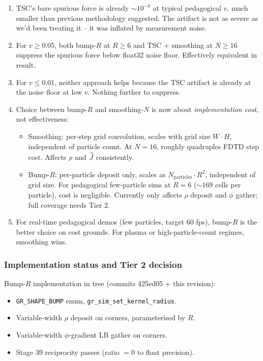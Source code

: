\documentclass[11pt,a4paper]{article}
\begin{document}
\begin{enumerate}
  \item TSC's bare spurious force is already $\sim 10^{-8}$ at
    typical pedagogical $v$, much smaller than previous methodology
    suggested.  The artifact is not as severe as we'd been treating
    it -- it was inflated by measurement noise.
  \item For $v \geq 0.05$, both bump-$R$ at $R \geq 6$ and TSC +
    smoothing at $N \geq 16$ suppress the spurious force below
    float32 noise floor.  Effectively equivalent in result.
  \item For $v \leq 0.01$, neither approach helps because the TSC
    artifact is already at the noise floor at low $v$.  Nothing
    further to suppress.
  \item Choice between bump-$R$ and smoothing-$N$ is now about
    \emph{implementation cost}, not effectiveness:
    \begin{itemize}
      \item Smoothing: per-step grid convolution, scales with grid
        size $W \cdot H$, independent of particle count.  At $N=16$,
        roughly quadruples FDTD step cost.  Affects $\rho$ and $\vec J$
        consistently.
      \item Bump-$R$: per-particle deposit only, scales as
        $N_{\mathrm{particles}} \cdot R^2$, independent of grid size.
        For pedagogical few-particle sims at $R=6$ ($\sim 169$ cells
        per particle), cost is negligible.  Currently only affects
        $\rho$ deposit and $\phi$ gather; full coverage needs Tier 2.
    \end{itemize}
  \item For real-time pedagogical demos (few particles, target 60 fps),
    bump-$R$ is the better choice on cost grounds.  For plasma or
    high-particle-count regimes, smoothing wins.
\end{enumerate}

\subsubsection*{Implementation status and Tier 2 decision}

Bump-$R$ implementation in tree (commits 425ed05 + this revision):
\begin{itemize}
  \item \texttt{GR\_SHAPE\_BUMP} enum, \texttt{gr\_sim\_set\_kernel\_radius}.
  \item Variable-width $\rho$ deposit on corners, parameterised by $R$.
  \item Variable-width $\phi$-gradient LB gather on corners.
  \item Stage 39 reciprocity passes (ratio $= 0$ to float precision).
\end{itemize}
\end{document}
